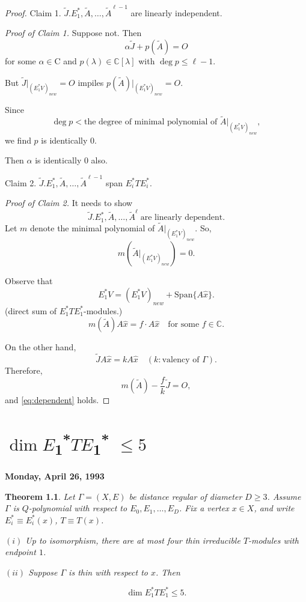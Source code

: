 \documentclass[
]{book}
\newtheorem{theorem}{Theorem}[chapter]
\theoremstyle{definition}
\theoremstyle{definition}
\theoremstyle{definition}
\theoremstyle{definition}
\theoremstyle{remark}
\begin{document}
\begin{proof}
Claim 1. \(\tilde{J}. E^*_1, \tilde{A}, \ldots, \tilde{A}^{\ell-1}\) are linearly independent.

\emph{Proof of Claim 1.}
Suppose not. Then
\[\alpha \tilde{J} + p(\tilde{A}) = O\]
for some \(\alpha\in \mathrm{C}\) and \(p(\lambda)\in \mathbb{C}[\lambda]\) with \(\deg p \leq \ell -1\).

But \(\tilde{J}|_{(E^*_1V)_{new}} = O\) impiles \(p(\tilde{A})|_{(E^*_1V)_{new}}=O\).

Since
\[\deg p < \text{the degree of minimal polynomial of $\tilde{A}|_{(E^*_1V)_{new}}$},\]
we find \(p\) is identically \(0\).

Then \(\alpha\) is identically \(0\) also.

Claim 2. \(\tilde{J}. E^*_1, \tilde{A}, \ldots, \tilde{A}^{\ell-1}\) span \(E^*_iTE^*_i\).

\emph{Proof of Claim 2.}
It needs to show
\begin{equation}
\tilde{J}. E^*_1, \tilde{A}, \ldots, \tilde{A}^{\ell} \; \text{are linearly dependent}.\label{eq:dependent}
\end{equation}
Let \(m\) denote the minimal polynomial of \(\tilde{A}|_{(E^*_1V)_{new}}\). So,
\[m(\tilde{A}|_{(E^*_1V)_{new}}) = 0.\]

Observe that
\[E^*_1V = (E^*_1V)_{new} + \mathrm{Span}\{A\hat{x}\}.\]
(direct sum of \(E^*_1TE^*_1\)-modules.)
\[m(\tilde{A})A\hat{x} = f\cdot A\hat{x}\quad \text{for some }f\in \mathbb{C}.\]

On the other hand,
\[\tilde{J}A\hat{x} = kA\hat{x} \quad (k: \text{valency of }\Gamma).\]
Therefore,
\[m(\tilde{A}) - \frac{f}{k}\tilde{J} = O,\]
and \eqref{eq:dependent} holds.

\end{proof}

\hypertarget{lec35}{%
\chapter{\texorpdfstring{\(\dim E\)\textsubscript{1}\textsuperscript{*}\(TE\)\textsubscript{1}\textsuperscript{*} \(\leq 5\)}{\textbackslash dim E1*TE1* \textbackslash leq 5}}\label{lec35}}

\textbf{Monday, April 26, 1993}

\begin{theorem}
\protect\hypertarget{thm:dim5}{}\label{thm:dim5}Let \(\Gamma = (X, E)\) be distance regular of diameter \(D\geq 3\).
Assume \(\Gamma\) is \(Q\)-polynomial with respect to
\(E_0, E_1, \ldots, E_D\).
Fix a vertex \(x\in X\), and write \(E^*_i\equiv E^*_i(x)\), \(T\equiv T(x)\).

\((i)\) Up to isomorphism, there are at most four thin irreducible \(T\)-modules with endpoint \(1\).

\((ii)\) Suppose \(\Gamma\) is thin with respect to \(x\). Then

\[\dim E^*_1TE^*_1 \leq 5.\]
\end{theorem}
\end{document}
